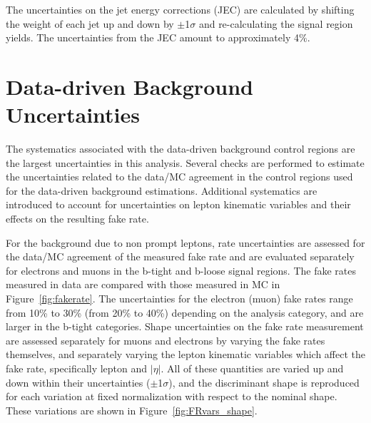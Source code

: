 The uncertainties on the jet energy corrections (JEC) are calculated by shifting the weight of each jet up and down
by $\pm$1$\sigma$ and re-calculating the signal region yields. The uncertainties from the JEC amount to approximately 4$\%$. 

\section{Data-driven Background Uncertainties}
The systematics associated with the data-driven background control regions are the largest uncertainties in this analysis. 
Several checks are performed to estimate the uncertainties related to the data/MC agreement in the control regions used for
the data-driven background estimations.
Additional systematics are introduced to account for uncertainties on lepton kinematic variables and their effects on the resulting fake rate. 

For the background due to non prompt leptons, rate uncertainties are assessed for the data/MC agreement of the measured fake rate
and are evaluated separately for electrons and muons in the b-tight and b-loose signal regions.
The fake rates measured in data are compared with those measured in MC in Figure~\ref{fig:fakerate}.
The uncertainties for the electron (muon) fake rates range from 10\% to 30\% (from 20\% to 40\%) depending on the analysis category, and are larger in the b-tight categories.
Shape uncertainties on the fake rate measurement are assessed separately for muons and electrons by varying the fake rates themselves,
and separately varying the lepton kinematic variables which affect the fake rate, specifically lepton \pt and $|\eta|$. All of these quantities are varied up and down
within their uncertainties ($\pm$1$\sigma$), and the discriminant shape is reproduced for each variation at fixed normalization with respect to the nominal shape.
These variations are shown in Figure~\ref{fig:FRvars_shape}.

